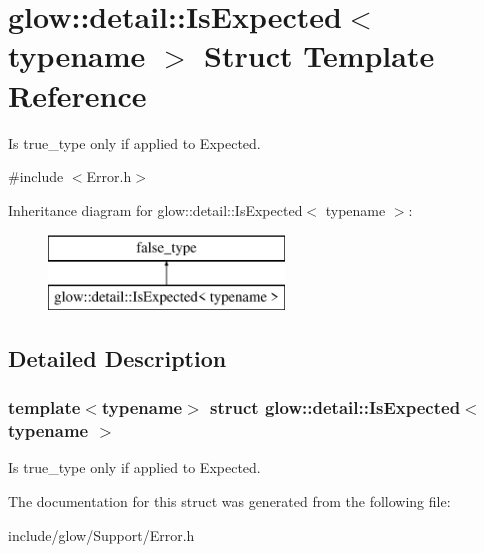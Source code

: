 \hypertarget{structglow_1_1detail_1_1_is_expected}{}\section{glow\+:\+:detail\+:\+:Is\+Expected$<$ typename $>$ Struct Template Reference}
\label{structglow_1_1detail_1_1_is_expected}


Is true\+\_\+type only if applied to Expected.  




{\ttfamily \#include $<$Error.\+h$>$}

Inheritance diagram for glow\+:\+:detail\+:\+:Is\+Expected$<$ typename $>$\+:\begin{figure}[H]
\begin{center}
\leavevmode
\includegraphics[height=2.000000cm]{structglow_1_1detail_1_1_is_expected}
\end{center}
\end{figure}


\subsection{Detailed Description}
\subsubsection*{template$<$typename$>$\newline
struct glow\+::detail\+::\+Is\+Expected$<$ typename $>$}

Is true\+\_\+type only if applied to Expected. 

The documentation for this struct was generated from the following file\+:\begin{DoxyCompactItemize}
\item 
include/glow/\+Support/Error.\+h\end{DoxyCompactItemize}
